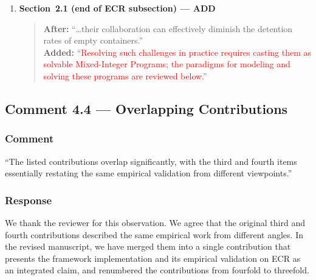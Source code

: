 \documentclass[11pt,a4paper]{article}
\begin{document}
\begin{enumerate}
\begin{quote}
\textbf{After:} ``\ldots employs container SCM as a representative application scenario.''\\[4pt]
\textbf{Added:} ``\textcolor{red}{We organize this review in two parts. We first survey the empty container repositioning challenges that motivate this work. We then trace the evolution of MIP modeling paradigms used to address such problems, from the expert-driven traditional approach, through the emerging paradigm in which a \emph{single} LLM handles the entire modeling-to-solving pipeline, to the multi-agent collaborative paradigm on which our work builds.}''
\end{quote}
\item \textbf{Section~2.1 (end of ECR subsection) --- ADD}
\begin{quote}
\textbf{After:} ``\ldots their collaboration can effectively diminish the detention rates of empty containers.''\\[4pt]
\textbf{Added:} ``\textcolor{red}{Resolving such challenges in practice requires casting them as solvable Mixed-Integer Programs; the paradigms for modeling and solving these programs are reviewed below.}''
\end{quote}
\end{enumerate}

\subsection{Comment 4.4 --- Overlapping Contributions}

\subsubsection{Comment}
``The listed contributions overlap significantly, with the third and fourth items essentially restating the same empirical validation from different viewpoints.''

\subsubsection{Response}
We thank the reviewer for this observation. We agree that the original third and fourth contributions described the same empirical work from different angles. In the revised manuscript, we have merged them into a single contribution that presents the framework implementation and its empirical validation on ECR as an integrated claim, and renumbered the contributions from fourfold to threefold.
\end{document}

